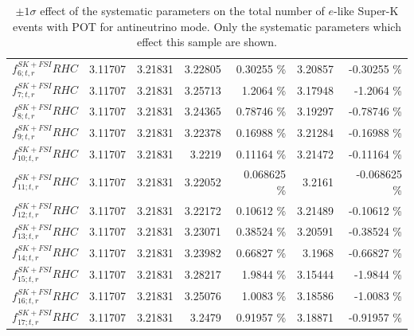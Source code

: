 \begin{table}
\begin{tabular}{| l | r | r | r  r | r  r |}
                                                       $f_{6; t, r}^{SK+FSI}RHC$ &         3.11707 & 3.21831 & 3.22805 &         0.30255 \%  &         3.20857 &        -0.30255 \%  \\ 
                                                       $f_{7; t, r}^{SK+FSI}RHC$ &         3.11707 & 3.21831 & 3.25713 &          1.2064 \%  &         3.17948 &         -1.2064 \%  \\ 
                                                       $f_{8; t, r}^{SK+FSI}RHC$ &         3.11707 & 3.21831 & 3.24365 &         0.78746 \%  &         3.19297 &        -0.78746 \%  \\ 
                                                       $f_{9; t, r}^{SK+FSI}RHC$ &         3.11707 & 3.21831 & 3.22378 &         0.16988 \%  &         3.21284 &        -0.16988 \%  \\ 
                                                      $f_{10; t, r}^{SK+FSI}RHC$ &         3.11707 & 3.21831 & 3.2219 &         0.11164 \%  &         3.21472 &        -0.11164 \%  \\ 
                                                      $f_{11; t, r}^{SK+FSI}RHC$ &         3.11707 & 3.21831 & 3.22052 &        0.068625 \%  &          3.2161 &       -0.068625 \%  \\ 
                                                      $f_{12; t, r}^{SK+FSI}RHC$ &         3.11707 & 3.21831 & 3.22172 &         0.10612 \%  &         3.21489 &        -0.10612 \%  \\ 
                                                      $f_{13; t, r}^{SK+FSI}RHC$ &         3.11707 & 3.21831 & 3.23071 &         0.38524 \%  &         3.20591 &        -0.38524 \%  \\ 
                                                      $f_{14; t, r}^{SK+FSI}RHC$ &         3.11707 & 3.21831 & 3.23982 &         0.66827 \%  &          3.1968 &        -0.66827 \%  \\ 
                                                      $f_{15; t, r}^{SK+FSI}RHC$ &         3.11707 & 3.21831 & 3.28217 &          1.9844 \%  &         3.15444 &         -1.9844 \%  \\ 
                                                      $f_{16; t, r}^{SK+FSI}RHC$ &         3.11707 & 3.21831 & 3.25076 &          1.0083 \%  &         3.18586 &         -1.0083 \%  \\ 
                                                      $f_{17; t, r}^{SK+FSI}RHC$ &         3.11707 & 3.21831 & 3.2479 &         0.91957 \%  &         3.18871 &        -0.91957 \%  \\ 
\hline

\end{tabular}
\caption{
$\pm 1 \sigma$ effect of the systematic parameters on the total number of $e$-like Super-K events with
\TotalPotNuBar{} POT for antineutrino 
mode.
   Only the systematic parameters which effect this sample are shown.
    \label{tab:syst_pm1sigma_elike_rhc}
}
\end{table}
